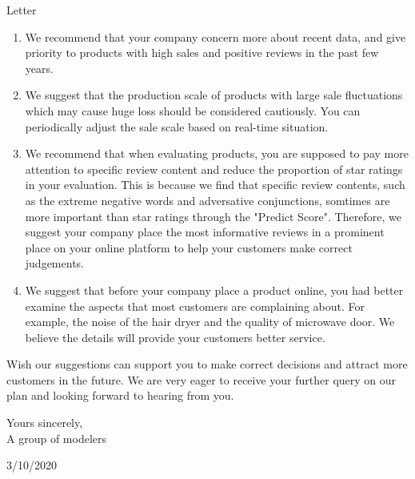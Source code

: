 \documentclass[12pt]{article}  %
\begin{document}
\begin{letter}{Letter}
\begin{enumerate}
    \item We recommend that your company concern more about recent data, and give priority to products with high sales and positive reviews in the past few years.
    \item We suggest that the production scale of products with large sale fluctuations which may cause huge loss should be considered cautiously. You can periodically adjust the sale scale based on real-time situation.
    \item We recommend that when evaluating products, you are supposed to pay more attention to specific review content and reduce the proportion of star ratings in your evaluation. This is because we find that specific review contents, such as the extreme negative words and adversative conjunctions, somtimes are more important than star ratings through the "Predict Score". Therefore, we suggest your company place the most informative reviews in a prominent place on your online platform to help your customers make correct judgements.
    \item We suggest that before your company place a product online, you had better examine the aspects that most customers are complaining about. For example, the noise of the hair dryer and the quality of microwave door. We believe the details will provide your customers better service.
\end{enumerate}
Wish our suggestions can support you to make correct decisions and attract more customers in the future. We are very eager to receive your further query on our plan and looking forward to hearing from you.\\

\begin{flushleft}Yours sincerely,\\
A group of modelers\\\end{flushleft}
\begin{flushright}3/10/2020\end{flushright}


\end{letter}
\end{document}
